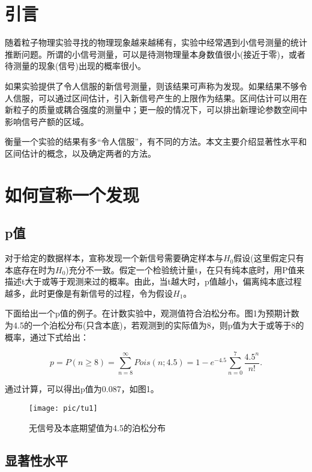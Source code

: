 

\section{引言}
随着粒子物理实验寻找的物理现象越来越稀有，实验中经常遇到小信号测量的统计推断问题。所谓的小信号测量，可以是待测物理量本身数值很小(接近于零)，或者待测量的现象(信号)出现的概率很小。

如果实验提供了令人信服的新信号测量，则该结果可声称为发现。如果结果不够令人信服，可以通过区间估计，引入新信号产生的上限作为结果。区间估计可以用在新粒子的质量或耦合强度的测量中；更一般的情况下，可以排出新理论参数空间中影响信号产额的区域。

衡量一个实验的结果有多“令人信服”，有不同的方法。本文主要介绍显著性水平和区间估计的概念，以及确定两者的方法。

\section{如何宣称一个发现}

\subsection{p值}

对于给定的数据样本，宣称发现一个新信号需要确定样本与$H_{0}$假设(这里假定只有本底存在时为$H_{0}$)充分不一致。假定一个检验统计量t，在只有纯本底时，用P值来描述t大于或等于观测来过的概率。由此，当t越大时，p值越小，偏离纯本底过程越多，此时更像是有新信号的过程，令为假设$H_{1}$。

下面给出一个p值的例子。在计数实验中，观测值符合泊松分布。图1为预期计数为4.5的一个泊松分布(只含本底)，若观测到的实际值为8，则p值为大于或等于8的概率，通过下式给出：

\begin{equation}\label{key}
p=P(n \geqslant 8)=\sum_{n=8}^{\infty} Pois(n; 4.5)

= 1 - e^{-4.5} \sum_{n=0}^{7} \dfrac{4.5^{n}}{n!}.
\end{equation}

通过计算，可以得出p值为0.087，如图1。

\begin{figure}[ht]
	\centering
	\texttt{[image: pic/tu1]}
	\caption{无信号及本底期望值为4.5的泊松分布}
	\label{fig:1}
\end{figure}

\subsection{显著性水平}

